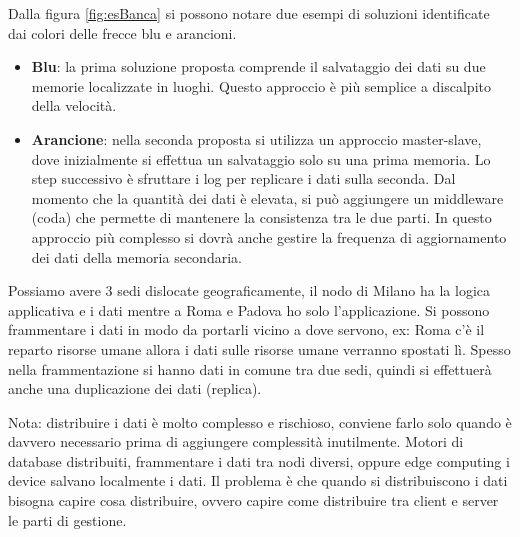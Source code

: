 Dalla figura \ref{fig:esBanca} si possono notare due esempi di soluzioni identificate dai colori
delle frecce blu e arancioni.
\begin{itemize}
    \item \textbf{Blu}: la prima soluzione proposta comprende il salvataggio dei dati su
            due memorie localizzate in luoghi. Questo approccio è più semplice a discalpito
            della velocità.
    \item \textbf{Arancione}: nella seconda proposta si utilizza un approccio 
            master-slave, dove inizialmente si effettua un salvataggio solo su una 
            prima memoria. Lo step successivo è sfruttare i log per replicare i dati
            sulla seconda. Dal momento che la quantità dei dati è elevata, si può
            aggiungere un middleware (coda) che permette di mantenere la consistenza
            tra le due parti. In questo approccio più complesso si dovrà anche gestire
            la frequenza di aggiornamento dei dati della memoria secondaria. 
\end{itemize}


Possiamo avere 3 sedi dislocate geograficamente, il nodo di Milano ha la logica applicativa
e i dati mentre a Roma e Padova ho solo l'applicazione. Si possono frammentare i
dati in modo da portarli vicino a dove servono, ex: Roma c'è il reparto risorse
umane allora i dati sulle risorse umane verranno spostati lì. Spesso nella frammentazione
si hanno dati in comune tra due sedi, quindi si effettuerà anche una duplicazione
dei dati (replica).

Nota: distribuire
i dati è molto complesso e rischioso, conviene farlo solo quando è davvero
necessario prima di aggiungere complessità inutilmente. Motori di database
distribuiti, frammentare i dati tra nodi diversi, oppure edge computing i device
salvano localmente i dati. Il problema è che quando si distribuiscono i dati
bisogna capire cosa distribuire, ovvero capire come distribuire tra client e
server le parti di gestione.
